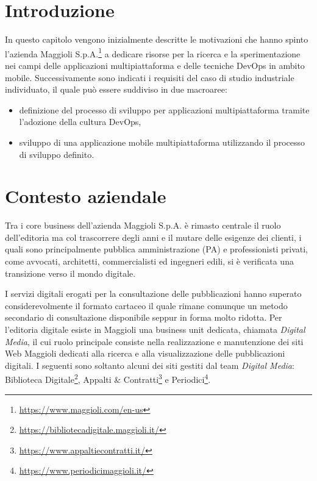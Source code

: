 
\section{Introduzione}

In questo capitolo vengono inizialmente descritte le motivazioni che hanno spinto l'azienda Maggioli S.p.A.\footnote{\href{https://www.maggioli.com/en-us}{https://www.maggioli.com/en-us}} a dedicare risorse per la ricerca e la sperimentazione nei campi delle applicazioni multipiattaforma e delle tecniche DevOps in ambito mobile. Successivamente sono indicati i requisiti del caso di studio industriale individuato, il quale può essere suddiviso in due macroaree:
\begin{itemize}
    \item definizione del processo di sviluppo per applicazioni multipiattaforma tramite l'adozione della cultura DevOps,
    \item sviluppo di una applicazione mobile multipiattaforma utilizzando il processo di sviluppo definito.
\end{itemize}

\section{Contesto aziendale}
Tra i core business dell'azienda Maggioli S.p.A. è rimasto centrale il ruolo dell'editoria ma col trascorrere degli anni e il mutare delle esigenze dei clienti, i quali sono principalmente pubblica amministrazione (PA) e professionisti privati, come avvocati, architetti, commercialisti ed ingegneri edili, si è verificata una transizione verso il mondo digitale.

I servizi digitali erogati per la consultazione delle pubblicazioni hanno superato considerevolmente il formato cartaceo il quale rimane comunque un metodo secondario di consultazione disponibile seppur in forma molto ridotta. Per l'editoria digitale esiste in Maggioli una business unit dedicata, chiamata \textit{Digital Media}, il cui ruolo principale consiste nella realizzazione e manutenzione dei siti Web Maggioli dedicati alla ricerca e alla visualizzazione delle pubblicazioni digitali. I seguenti sono soltanto alcuni dei siti gestiti dal team \textit{Digital Media}: Biblioteca Digitale\footnote{\href{https://bibliotecadigitale.maggioli.it/}{https://bibliotecadigitale.maggioli.it/}}, Appalti \& Contratti\footnote{\href{https://www.appaltiecontratti.it/}{https://www.appaltiecontratti.it/}} e Periodici\footnote{\href{https://www.periodicimaggioli.it/}{https://www.periodicimaggioli.it/}}. 

